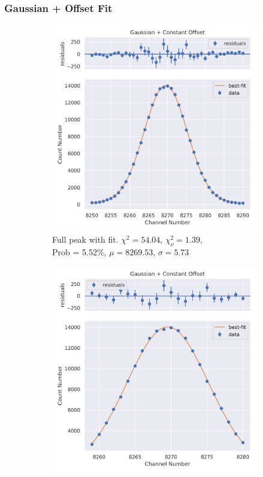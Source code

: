 \documentclass[11pt,a4paper]{article}
\begin{document}
\subsubsection{Gaussian + Offset Fit}
\begin{figure}[H]
  \centering
  \begin{subfigure}{.5\linewidth}
    \centering
    \includegraphics[width=\linewidth]{./Images/Cobalt60/Gauss/Gauss_1_Full.png}
    \caption{Full peak with fit. $\chi^2 = 54.04$, $\chi^2_\nu = 1.39$, \\ Prob = 5.52\%, $\mu = 8269.53$, $\sigma = 5.73$}
  \end{subfigure}%
  \begin{subfigure}{.5\linewidth}
    \centering
    \includegraphics[width=\linewidth]{./Images/Cobalt60/Gauss/Gauss_1_Zoom.png}

\end{subfigure}
\end{figure}
\end{document}
